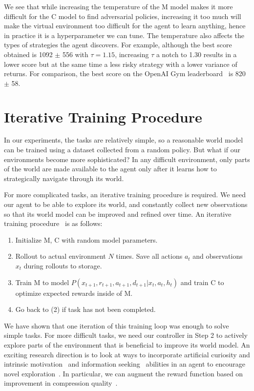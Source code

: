 \documentclass{article}
\begin{document}
We see that while increasing the temperature of the M model makes it more difficult for the C model to find adversarial policies, increasing it too much will make the virtual environment too difficult for the agent to learn anything, hence in practice it is a hyperparameter we can tune. The temperature also affects the types of strategies the agent discovers. For example, although the best score obtained is 1092 $\pm$ 556 with $\tau=1.15$, increasing $\tau$ a notch to 1.30 results in a lower score but at the same time a less risky strategy with a lower variance of returns. For comparison, the best score on the OpenAI Gym leaderboard~\cite{takecover} is 820 $\pm$ 58.
\vskip -0.1in
\section{Iterative Training Procedure}

In our experiments, the tasks are relatively simple, so a reasonable world model can be trained using a dataset collected from a random policy. But what if our environments become more sophisticated? In any difficult environment, only parts of the world are made available to the agent only after it learns how to strategically navigate through its world.

For more complicated tasks, an iterative training procedure is required. We need our agent to be able to explore its world, and constantly collect new observations so that its world model can be improved and refined over time. An iterative training procedure~\cite{learning_to_think} is as follows:

\begin{enumerate}
  \item Initialize M, C with random model parameters.
  \item Rollout to actual environment $N$ times. Save all actions $a_t$ and observations $x_t$ during rollouts to storage.
  \item Train M to model $P(x_{t+1}, r_{t+1}, a_{t+1}, d_{t+1} | x_t, a_t, h_t)$ and train C to optimize expected rewards inside of M.
  \item Go back to (2) if task has not been completed.
\end{enumerate}

We have shown that one iteration of this training loop was enough to solve simple tasks. For more difficult tasks, we need our controller in Step 2 to actively explore parts of the environment that is beneficial to improve its world model. An exciting research direction is to look at ways to incorporate artificial curiosity and intrinsic motivation~\cite{schmidhuber_creativity,s07_intrinsic,s08_curiousity,pathak2017,intrinsic_motivation} and information seeking~\cite{SchmidhuberStorck:94,Gottlieb2013} abilities in an agent to encourage novel exploration~\cite{Lehman2011}. In particular, we can augment the reward function based on improvement in compression quality~\cite{schmidhuber_creativity,s07_intrinsic,s08_curiousity,learning_to_think}.
\end{document}
